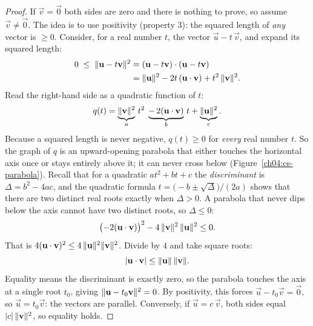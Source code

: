\begin{proof}
If $\vec v = \vec 0$ both sides are zero and there is nothing to prove, so assume
$\vec v\ne\vec 0$. The idea is to use positivity (property 3): the squared length of
\emph{any} vector is $\ge 0$. Consider, for a real number $t$, the vector
$\vec u - t\,\vec v$, and expand its squared length:
\begin{align*}
  0 \;\le\; \lVert\mathbf{u} - t\mathbf{v}\rVert^2
    &= (\mathbf{u} - t\mathbf{v})\cdot(\mathbf{u} - t\mathbf{v})\\
    &= \lVert\mathbf{u}\rVert^2 - 2t\,(\mathbf{u}\cdot\mathbf{v}) + t^2\,\lVert\mathbf{v}\rVert^2.
\end{align*}
Read the right-hand side as a quadratic function of $t$:
\[
  q(t) = \underbrace{\lVert\mathbf{v}\rVert^2}_{a}\, t^2
         \;\underbrace{-\,2(\mathbf{u}\cdot\mathbf{v})}_{b}\, t
         + \underbrace{\lVert\mathbf{u}\rVert^2}_{c}.
\]
Because a squared length is never negative, $q(t)\ge 0$ for \emph{every} real number
$t$. So the graph of $q$ is an upward-opening parabola that either touches the
horizontal axis once or stays entirely above it; it can never cross below
(Figure~\ref{ch04:cs-parabola}). Recall that for a quadratic $at^2+bt+c$ the
\emph{discriminant} is $\Delta=b^2-4ac$, and the quadratic formula
$t=\bigl(-b\pm\sqrt{\Delta}\bigr)/(2a)$ shows that there are two distinct real roots
exactly when $\Delta>0$. A parabola that never dips below the axis cannot have two
distinct roots, so $\Delta\le 0$:
\[
  \bigl(-2(\mathbf{u}\cdot\mathbf{v})\bigr)^2 - 4\,\lVert\mathbf{v}\rVert^2\,\lVert\mathbf{u}\rVert^2 \le 0.
\]
That is $4(\mathbf{u}\cdot\mathbf{v})^2 \le 4\,\lVert\mathbf{u}\rVert^2\lVert\mathbf{v}\rVert^2$. Divide by $4$
and take square roots:
\[
  \lvert\mathbf{u}\cdot\mathbf{v}\rvert \le \lVert\mathbf{u}\rVert\,\lVert\mathbf{v}\rVert.
\]
Equality means the discriminant is exactly zero, so the parabola touches the axis at a single root
$t_0$, giving $\lVert\mathbf{u} - t_0\mathbf{v}\rVert^2 = 0$. By positivity, this forces
$\vec u - t_0\vec v = \vec 0$, so $\vec u = t_0\vec v$: the vectors are parallel.
Conversely, if $\vec u = c\,\vec v$, both sides equal $\lvert c\rvert\,\lVert\mathbf{v}\rVert^2$, so
equality holds.
\end{proof}

